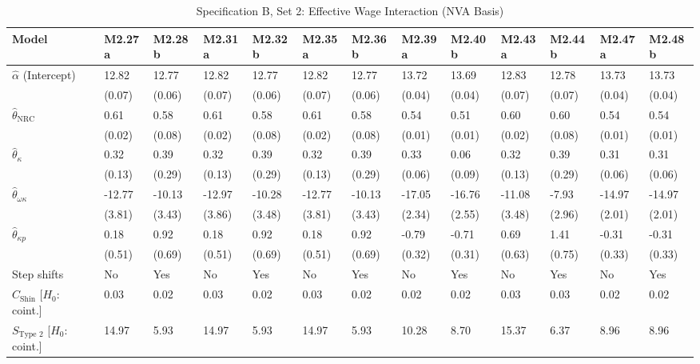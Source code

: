 \FloatBarrier
\begin{table}[h!]
	\centering
	\caption{Specification B, Set 2: Effective Wage Interaction (NVA Basis)}
	\label{tab:specB_set2_nva_app}
	\tiny
	\setlength{\tabcolsep}{1.5pt}
	\begin{tabular}{p{3.2cm}p{1.0cm}p{1.0cm}p{1.0cm}p{1.0cm}p{1.0cm}p{1.0cm}p{1.0cm}p{1.0cm}p{1.0cm}p{1.0cm}p{1.0cm}p{1.0cm}}
		\toprule
		Model & M2.27a & M2.28b & M2.31a & M2.32b & M2.35a & M2.36b & M2.39a & M2.40b & M2.43a & M2.44b & M2.47a & M2.48b \\
		\midrule
		$\hat{\alpha}$ (Intercept) & 12.82 & 12.77 & 12.82 & 12.77 & 12.82 & 12.77 & 13.72 & 13.69 & 12.83 & 12.78 & 13.73 & 13.73 \\
		& (0.07) & (0.06) & (0.07) & (0.06) & (0.07) & (0.06) & (0.04) & (0.04) & (0.07) & (0.07) & (0.04) & (0.04) \\
		$\hat{\theta}_{\text{NRC}}$ & 0.61 & 0.58 & 0.61 & 0.58 & 0.61 & 0.58 & 0.54 & 0.51 & 0.60 & 0.60 & 0.54 & 0.54 \\
		& (0.02) & (0.08) & (0.02) & (0.08) & (0.02) & (0.08) & (0.01) & (0.01) & (0.02) & (0.08) & (0.01) & (0.01) \\
		$\hat{\theta}_{\kappa}$ & 0.32 & 0.39 & 0.32 & 0.39 & 0.32 & 0.39 & 0.33 & 0.06 & 0.32 & 0.39 & 0.31 & 0.31 \\
		& (0.13) & (0.29) & (0.13) & (0.29) & (0.13) & (0.29) & (0.06) & (0.09) & (0.13) & (0.29) & (0.06) & (0.06) \\
		$\hat{\theta}_{\omega\kappa}$ & -12.77 & -10.13 & -12.97 & -10.28 & -12.77 & -10.13 & -17.05 & -16.76 & -11.08 & -7.93 & -14.97 & -14.97 \\
		& (3.81) & (3.43) & (3.86) & (3.48) & (3.81) & (3.43) & (2.34) & (2.55) & (3.48) & (2.96) & (2.01) & (2.01) \\
		$\hat{\theta}_{\kappa p}$ & 0.18 & 0.92 & 0.18 & 0.92 & 0.18 & 0.92 & -0.79 & -0.71 & 0.69 & 1.41 & -0.31 & -0.31 \\
		& (0.51) & (0.69) & (0.51) & (0.69) & (0.51) & (0.69) & (0.32) & (0.31) & (0.63) & (0.75) & (0.33) & (0.33) \\
		\midrule
		Step shifts & No & Yes & No & Yes & No & Yes & No & Yes & No & Yes & No & Yes \\
		$C_{\text{Shin}}$ [$H_0$: coint.] & 0.03 & 0.02 & 0.03 & 0.02 & 0.03 & 0.02 & 0.02 & 0.02 & 0.03 & 0.03 & 0.02 & 0.02 \\
		$S_{\text{Type 2}}$ [$H_0$: coint.] & 14.97 & 5.93 & 14.97 & 5.93 & 14.97 & 5.93 & 10.28 & 8.70 & 15.37 & 6.37 & 8.96 & 8.96 \\

\end{tabular}
\end{table}
